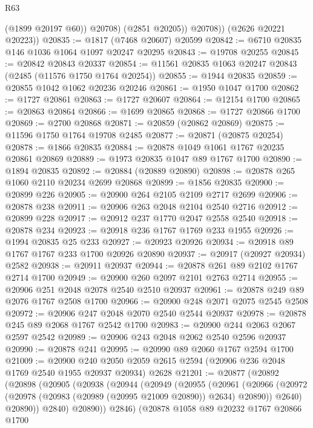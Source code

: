 \begin{lexlean}{R63}
\begin{coremodule}
                (@1899 @20197 @60))
              @20708)
            (@2851 @20205))
          @20708))
      (@2626 @20221 @20223))
@20835 := @1817 (@7468 @20607) @20599
@20842 := @6710 @20835 @146 @1036 @1064 @1097 @20247 @20295
@20843 := @19708 @20255
@20845 := @20842 @20843 @20337
@20854 := @11561 @20835 @1063 @20247 @20843 (@2485 (@11576 @1750 @1764 @20254))
@20855 := @1944 @20835
@20859 := @20855 @1042 @1062 @20236 @20246
@20861 := @1950 @1047 @1700
@20862 := @1727 @20861
@20863 := @1727 @20607
@20864 := @12154 @1700
@20865 := @20863 @20864
@20866 := @1699 @20865
@20868 := @1727 @20866 @1700
@20869 := @2700 @20868
@20871 := @20859 (@20862 @20869)
@20875 := @11596 @1750 @1764 @19708 @2485
@20877 := @20871 (@20875 @20254)
@20878 := @1866 @20835
@20884 := @20878 @1049 @1061 @1767 @20235 @20861 @20869
@20889 := @1973 @20835 @1047 @89 @1767 @1700
@20890 := @1894 @20835
@20892 := @20884 (@20889 @20890)
@20898 := @20878 @265 @1060 @2110 @20234 @2699 @20868
@20899 := @1856 @20835
@20900 := @20899 @226
@20905 := @20900 @264 @2105 @2109 @2717 @2699
@20906 := @20878 @238
@20911 := @20906 @263 @2048 @2104 @2540 @2716
@20912 := @20899 @228
@20917 := @20912 @237 @1770 @2047 @2558 @2540
@20918 := @20878 @234
@20923 := @20918 @236 @1767 @1769 @233 @1955
@20926 := @1994 @20835 @25 @233
@20927 := @20923 @20926
@20934 := @20918 @89 @1767 @1767 @233 @1700 @20926 @20890
@20937 := @20917 (@20927 @20934) @2582
@20938 := @20911 @20937
@20944 := @20878 @261 @89 @2102 @1767 @2714 @1700
@20949 := @20900 @260 @2097 @2101 @2763 @2714
@20955 := @20906 @251 @2048 @2078 @2540 @2510 @20937
@20961 := @20878 @249 @89 @2076 @1767 @2508 @1700
@20966 := @20900 @248 @2071 @2075 @2545 @2508
@20972 := @20906 @247 @2048 @2070 @2540 @2544 @20937
@20978 := @20878 @245 @89 @2068 @1767 @2542 @1700
@20983 := @20900 @244 @2063 @2067 @2597 @2542
@20989 := @20906 @243 @2048 @2062 @2540 @2596 @20937
@20990 := @20878 @241
@20995 := @20990 @89 @2060 @1767 @2594 @1700
@21009 := @20900
    @240
    @2050
    @2059
    @2615
    @2594
    (@20906 @236 @2048 @1769 @2540 @1955 @20937 @20934)
    @2628
@21201 := @20877
    (@20892
      (@20898
        (@20905
          (@20938
            (@20944
              (@20949
                (@20955
                  (@20961
                    (@20966
                      (@20972 (@20978 (@20983 (@20989 (@20995 @21009 @20890)) @2634) @20890))
                      @2640)
                    @20890))
                @2840)
              @20890))
          @2846)
        (@20878
          @1058
          @89
          @20232
          @1767
          @20866
          @1700

\end{coremodule}
\end{lexlean}
